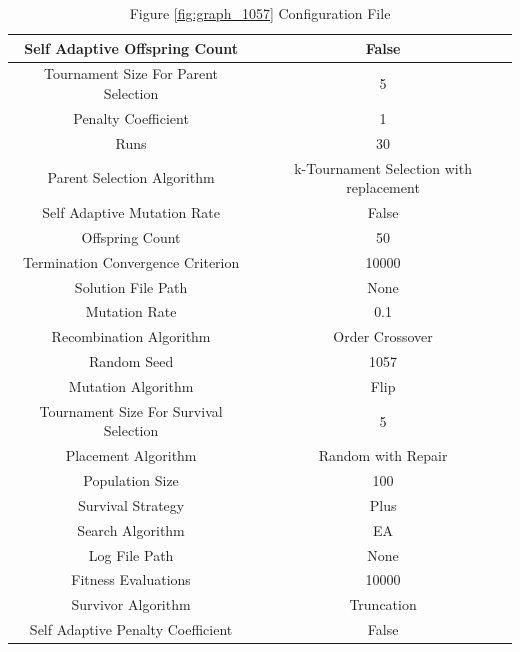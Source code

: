 \documentclass{standalone}
\begin{document}
\begin{table}[!htb]
	\centering
	\caption{Figure \ref{fig:graph_1057} Configuration File}
	\label{tab:graph_1057}
	\begin{tabular}{| c | c |}
		\hline
		Self Adaptive Offspring Count		& False		 \\
		\hline
		Tournament Size For Parent Selection		& 5		 \\
		\hline
		Penalty Coefficient		& 1		 \\
		\hline
		Runs		& 30		 \\
		\hline
		Parent Selection Algorithm		& k-Tournament Selection with replacement		 \\
		\hline
		Self Adaptive Mutation Rate		& False		 \\
		\hline
		Offspring Count		& 50		 \\
		\hline
		Termination Convergence Criterion		& 10000		 \\
		\hline
		Solution File Path		& None		 \\
		\hline
		Mutation Rate		& 0.1		 \\
		\hline
		Recombination Algorithm		& Order Crossover		 \\
		\hline
		Random Seed		& 1057		 \\
		\hline
		Mutation Algorithm		& Flip		 \\
		\hline
		Tournament Size For Survival Selection		& 5		 \\
		\hline
		Placement Algorithm		& Random with Repair		 \\
		\hline
		Population Size		& 100		 \\
		\hline
		Survival Strategy		& Plus		 \\
		\hline
		Search Algorithm		& EA		 \\
		\hline
		Log File Path		& None		 \\
		\hline
		Fitness Evaluations		& 10000		 \\
		\hline
		Survivor Algorithm		& Truncation		 \\
		\hline
		Self Adaptive Penalty Coefficient		& False		 \\
		\hline
	\end{tabular}
\end{table}
\end{document}
